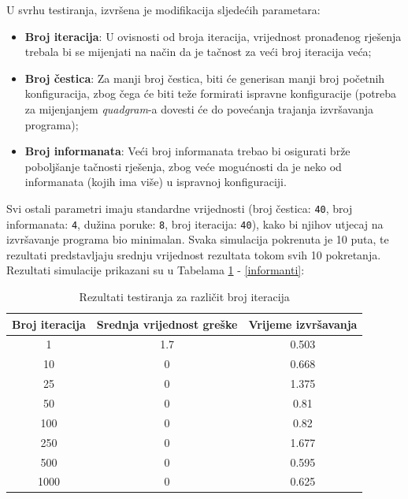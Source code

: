 \documentclass[12pt, a4paper]{article}
\begin{document}
U svrhu testiranja, izvršena je modifikacija sljedećih parametara:

\begin{itemize}
\renewcommand\labelitemi{--}

\item \textbf{Broj iteracija}: U ovisnosti od broja iteracija, vrijednost pronađenog rješenja trebala bi se mijenjati na način da je tačnost za veći broj iteracija veća;
\item \textbf{Broj čestica}: Za manji broj čestica, biti će generisan manji broj početnih konfiguracija, zbog čega će biti teže formirati ispravne konfiguracije (potreba za mijenjanjem \textit{quadgram}-a dovesti će do povećanja trajanja izvršavanja programa);
\item \textbf{Broj informanata}: Veći broj informanata trebao bi osigurati brže poboljšanje tačnosti rješenja, zbog veće mogućnosti da je neko od informanata (kojih ima više) u ispravnoj konfiguraciji.

\end{itemize}

Svi ostali parametri imaju standardne vrijednosti (broj čestica: \texttt{40}, broj informanata: \texttt{4}, dužina poruke: \texttt{8}, broj iteracija: \texttt{40}), kako bi njihov utjecaj na izvršavanje programa bio minimalan. Svaka simulacija pokrenuta je 10 puta, te rezultati predstavljaju srednju vrijednost rezultata tokom svih 10 pokretanja. Rezultati simulacije prikazani su u Tabelama \ref{iteracije} - \ref{informanti}:

\begin{table}[H]
\centering
\begin{tabular}{| c | c | c |} \hline
\textbf{Broj iteracija}		& \textbf{Srednja vrijednost greške}	& \textbf{Vrijeme izvršavanja}		\\ \hline
1						& 1.7								& 0.503								\\ \hline
10						& 0									& 0.668								\\ \hline
25						& 0									& 1.375								\\ \hline
50						& 0									& 0.81								\\ \hline
100						& 0									& 0.82								\\ \hline
250						& 0									& 1.677								\\ \hline
500						& 0									& 0.595								\\ \hline
1000					& 0									& 0.625								\\ \hline
\end{tabular}
\caption{Rezultati testiranja za različit broj iteracija}
\label{iteracije}
\end{table}
\end{document}
